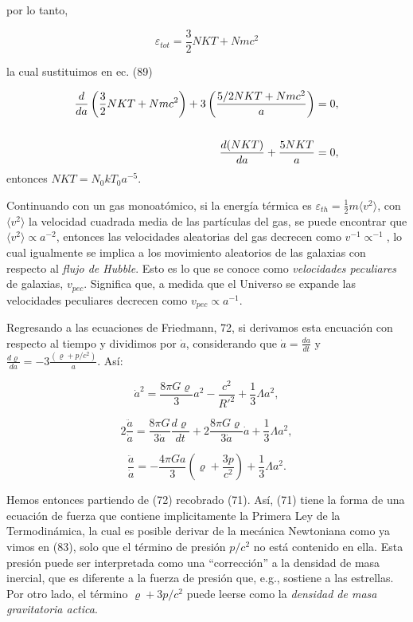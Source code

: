 \documentclass{article}
\begin{document}
    por lo tanto,
    
    $$\varepsilon_{tot} = \frac{3}{2} NKT + Nmc^2$$
    
    la cual sustituimos en ec. (89)
    
    \begin{align}
        \frac{d}{da} \left( \frac{3}{2} NKT + Nmc^2 \right) + 3 \left( \frac{5/2 NKT + Nmc^2}{a} \right) = 0, \notag \\
        \notag \\
        \frac{d(NKT)}{da} + \frac{5NKT}{a}  = 0,
    \end{align}
     entonces $NKT = N_0kT_0 a^{-5}$.
    
    Continuando con un gas monoatómico, si la energía térmica es $\varepsilon_{th} =  \frac{1}{2}m \langle v^2 \rangle$, con $ \langle v^2 \rangle$ la velocidad cuadrada media de las partículas del gas, se puede encontrar que $ \langle v^2 \rangle \propto a^{-2}$, entonces las velocidades aleatorias del gas decrecen como $v^{-1} \propto^{-1}$, lo cual igualmente se implica a los movimiento aleatorios de las galaxias con respecto al {\textit{flujo de Hubble}}. Esto es lo que se conoce como {\textit{velocidades peculiares}} de galaxias, $v_{pec}$. Significa que, a medida que el Universo se expande las velocidades peculiares decrecen como $v_{pec} \propto a^{-1}$.
    
    Regresando a las ecuaciones de Friedmann, 72, si derivamos esta encuación con respecto al tiempo y dividimos por $\dot{a}$, considerando que $\dot{a} = \frac{da}{dt}$ y  $\frac{d\varrho}{da} = - 3 \frac{(\varrho + p/c^2)}{a}$. Así: 
    
    \begin{equation}
        \boxed{\dot{a}^2 =  \frac{8 \pi G \varrho}{3} a^2 - \frac{c^2}{R'^2} + \frac{1}{3} \Lambda a^2,}
    \end{equation}
    
    \begin{equation*}
        2 \frac{\ddot{a}}{\dot{a}} =  \frac{8 \pi G}{3\dot{a}} \frac{d\varrho}{dt} +  2\frac{8 \pi G \varrho}{3 \dot{a}} \dot{a} + \frac{1}{3} \Lambda a^2,
    \end{equation*}
           
    \begin{equation}
        \boxed{\frac{\ddot{a}}{\dot{a}} = - \frac{4 \pi G a}{3} \left(\varrho + \frac{3p}{c^2} \right) + \frac{1}{3} \Lambda a^2}.
    \end{equation}
         
    Hemos entonces partiendo de (72) recobrado (71). Así, (71) tiene la forma de una ecuación de fuerza que contiene implicitamente la Primera Ley de la Termodinámica, la cual es posible derivar de la mecánica Newtoniana como ya vimos en (83), solo que el término de presión $p/c^2$ no está contenido en ella. Esta presión puede ser interpretada como una ``corrección'' a la densidad de masa inercial, que es diferente a la fuerza de presión que, e.g., sostiene a las estrellas. 
    Por otro lado, el término $\varrho + 3p/c^2$ puede leerse como la {\textit{densidad de masa gravitatoria actica}}. 
        
    
    
\end{document}
